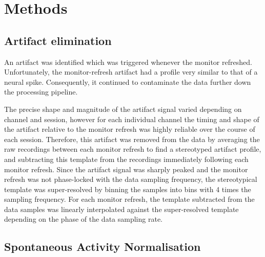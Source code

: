 \section{Methods}
\FloatBarrier
\subsection{Artifact elimination}
\label{sec:pl_artifact_elimination}
\label{sec:ma}

An artifact was identified which was triggered whenever the monitor refreshed.
Unfortunately, the monitor-refresh artifact had a profile very similar to that of a neural spike.
Consequently, it continued to contaminate the data further down the processing pipeline.

The precise shape and magnitude of the artifact signal varied depending on channel and session, however for each individual channel the timing and shape of the artifact relative to the monitor refresh was highly reliable over the course of each session.
Therefore, this artifact was removed from the data by averaging the raw recordings between each monitor refresh to find a stereotyped artifact profile, and subtracting this template from the recordings immediately following each monitor refresh.
Since the artifact signal was sharply peaked and the monitor refresh was not phase-locked with the data sampling frequency, the stereotypical template was super-resolved by binning the samples into bins with 4 times the sampling frequency.
For each monitor refresh, the template subtracted from the data samples was linearly interpolated against the super-resolved template depending on the phase of the data sampling rate.


\subsection{Spontaneous Activity Normalisation}
\label{sec:pl_san}

